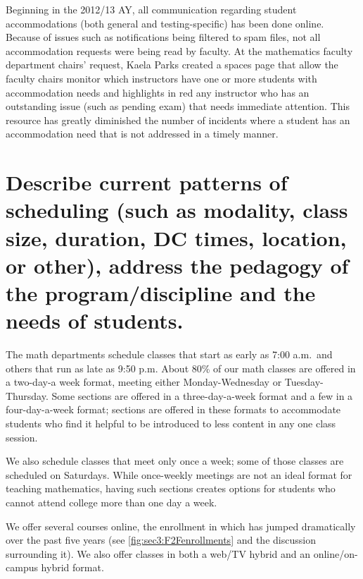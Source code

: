 Beginning in the 2012/13 AY, all communication regarding student accommodations
(both general and testing-specific) has been done online.
Because of issues such as notifications being filtered to spam files, not all
accommodation requests were being read by faculty.  At the  mathematics faculty
department chairs' request, Kaela Parks created a spaces page that allow the
faculty chairs monitor which instructors have one or more students with
accommodation needs and highlights in red any instructor who has an outstanding
issue (such as pending exam) that needs immediate attention.  This resource has
greatly diminished the number of incidents where a student has an
accommodation need that is not addressed in a timely manner.

\section[Patterns of scheduling]{Describe current patterns of scheduling (such as modality, class size, duration, DC times, location, or other), address the pedagogy of the program/discipline and the needs of students.} 
\label{facilities:sec:scheduling}
The math departments schedule classes that start as early as 7:00 {\sc a.m.}\ and
others that run as late as 9:50 {\sc p.m.}  About 80\% of our math classes are offered
in a two-day-a week format, meeting either Monday-Wednesday or
Tuesday-Thursday.  Some sections are offered in a three-day-a-week format and a
few in a four-day-a-week format; sections are offered in these formats to
accommodate students who find it helpful to be introduced to less content in
any one class session.  

We also schedule classes that meet only once a week; some of those classes are
scheduled on  Saturdays.   While once-weekly meetings are not an ideal format for
teaching mathematics, having such sections creates options for students who
cannot attend college more than one day a week.  

We offer several courses online, the enrollment in which has jumped
dramatically over the past five years (see \vref{fig:sec3:F2Fenrollments} and the discussion
surrounding it).  We also offer classes in both a web/TV hybrid and an online/on-campus hybrid format.

